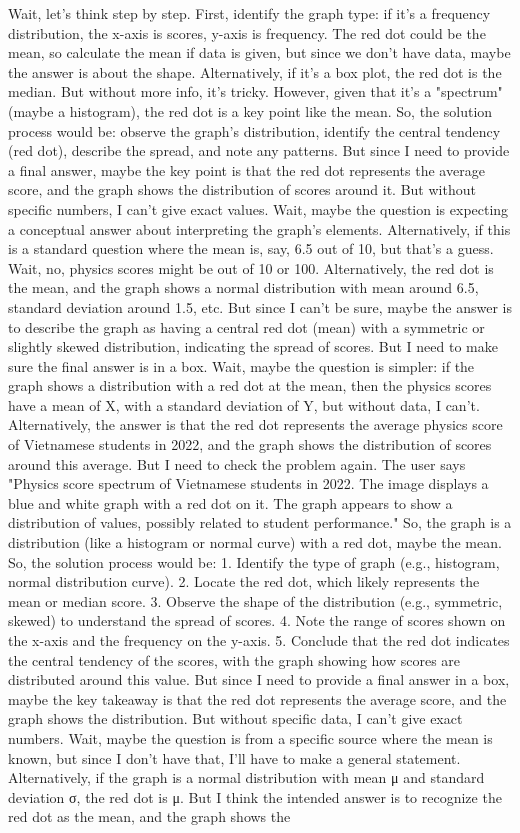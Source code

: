 Wait, let's think step by step. First, identify the graph type: if it's a frequency distribution, the x-axis is scores, y-axis is frequency. The red dot could be the mean, so calculate the mean if data is given, but since we don't have data, maybe the answer is about the shape. Alternatively, if it's a box plot, the red dot is the median. But without more info, it's tricky. However, given that it's a "spectrum" (maybe a histogram), the red dot is a key point like the mean. So, the solution process would be: observe the graph's distribution, identify the central tendency (red dot), describe the spread, and note any patterns. But since I need to provide a final answer, maybe the key point is that the red dot represents the average score, and the graph shows the distribution of scores around it. But without specific numbers, I can't give exact values. Wait, maybe the question is expecting a conceptual answer about interpreting the graph's elements. Alternatively, if this is a standard question where the mean is, say, 6.5 out of 10, but that's a guess. Wait, no, physics scores might be out of 10 or 100. Alternatively, the red dot is the mean, and the graph shows a normal distribution with mean around 6.5, standard deviation around 1.5, etc. But since I can't be sure, maybe the answer is to describe the graph as having a central red dot (mean) with a symmetric or slightly skewed distribution, indicating the spread of scores. But I need to make sure the final answer is in a box. Wait, maybe the question is simpler: if the graph shows a distribution with a red dot at the mean, then the physics scores have a mean of X, with a standard deviation of Y, but without data, I can't. Alternatively, the answer is that the red dot represents the average physics score of Vietnamese students in 2022, and the graph shows the distribution of scores around this average. But I need to check the problem again. The user says "Physics score spectrum of Vietnamese students in 2022. The image displays a blue and white graph with a red dot on it. The graph appears to show a distribution of values, possibly related to student performance." So, the graph is a distribution (like a histogram or normal curve) with a red dot, maybe the mean. So, the solution process would be: 1. Identify the type of graph (e.g., histogram, normal distribution curve). 2. Locate the red dot, which likely represents the mean or median score. 3. Observe the shape of the distribution (e.g., symmetric, skewed) to understand the spread of scores. 4. Note the range of scores shown on the x-axis and the frequency on the y-axis. 5. Conclude that the red dot indicates the central tendency of the scores, with the graph showing how scores are distributed around this value. But since I need to provide a final answer in a box, maybe the key takeaway is that the red dot represents the average score, and the graph shows the distribution. But without specific data, I can't give exact numbers. Wait, maybe the question is from a specific source where the mean is known, but since I don't have that, I'll have to make a general statement. Alternatively, if the graph is a normal distribution with mean μ and standard deviation σ, the red dot is μ. But I think the intended answer is to recognize the red dot as the mean, and the graph shows the 